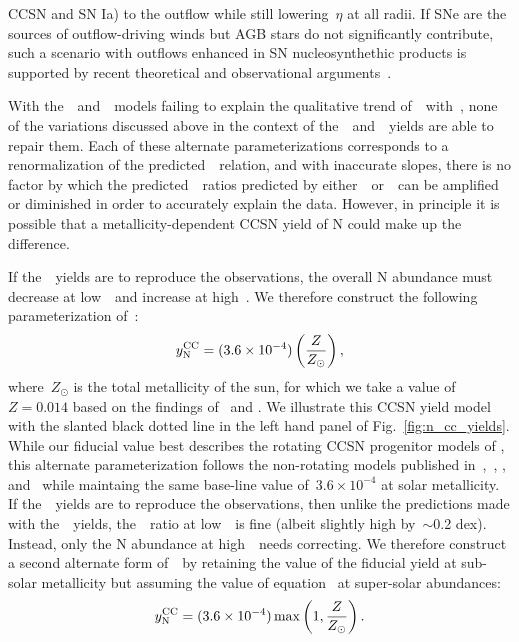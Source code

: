 \documentclass[ms.tex]{subfiles}
\begin{document}
CCSN and SN Ia) to the outflow while still lowering~$\eta$ at all radii.
If SNe are the sources of outflow-driving winds but AGB stars do not
significantly contribute, such a scenario with outflows enhanced in SN
nucleosynthethic products is supported by recent theoretical
\citep{Christensen2018} and observational arguments~\citep*{Chisholm2018}.
\par
With the~\karakasten~and~\karakas~models failing to explain the qualitative
trend of~\no~with~\oh, none of the variations discussed above in the
context of the~\cristallo~and~\ventura~yields are able to repair them.
Each of these alternate parameterizations corresponds to a renormalization of
the predicted~\ohno~relation, and with inaccurate slopes, there is no factor by
which the predicted~\no~ratios predicted by either~\karakasten~or~\karakas~can
be amplified or diminished in order to accurately explain the data.
However, in principle it is possible that a metallicity-dependent CCSN yield of
N could make up the difference.
\par
If the~\karakasten~yields are to reproduce the observations, the overall N
abundance must decrease at low~\oh~and increase at high~\oh.
We therefore construct the following parameterization of~:
\begin{equation}
y_\text{N}^\text{CC} = (3.6\times10^{-4})\left(\frac{Z}{Z_\odot}\right),
\label{eq:linear_yncc}
\end{equation}
where~$Z_\odot$ is the total metallicity of the sun, for which we take a value
of~$Z = 0.014$ based on the findings of~\citet{Asplund2009} and
\citet*{Asplund2021}.
We illustrate this CCSN yield model with the slanted black dotted line in the
left hand panel of Fig.~\ref{fig:n_cc_yields}.
While our fiducial value best describes the rotating CCSN progenitor models of
\citet{Limongi2018}, this alternate parameterization follows the non-rotating
models published in~\citet{Limongi2018},~\citet{Sukhbold2016},
\citet{Nomoto2013}, and~\citet{Woosley1995} while maintaing the same base-line
value of~$3.6\times10^{-4}$ at solar metallicity.
If the~\karakas~yields are to reproduce the observations, then unlike the
predictions made with the~\karakasten~yields, the~\no~ratio at low~\oh~is
fine (albeit slightly high by~$\sim$0.2 dex).
Instead, only the N abundance at high~\oh~needs correcting.
We therefore construct a second alternate form of~~by retaining the
value of the fiducial yield at sub-solar metallicity but assuming the value of
equation~ at super-solar abundances:
\begin{equation}
y_\text{N}^\text{CC} = (3.6\times10^{-4})\max\left(1, \frac{Z}{Z_\odot}\right).
\label{eq:broken_yncc}
\end{equation}
\end{document}

